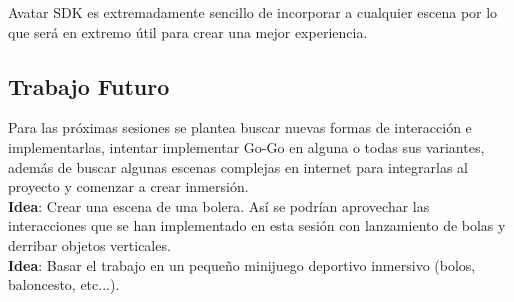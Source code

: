 \documentclass[12pt,a4paper]{article}
\begin{document}
Avatar SDK es extremadamente sencillo de incorporar a cualquier escena por lo que será en extremo útil para crear una mejor experiencia.

\subsection{Trabajo Futuro}

Para las próximas sesiones se plantea buscar nuevas formas de interacción e implementarlas, intentar implementar Go-Go en alguna o todas sus variantes, además de buscar algunas escenas complejas en internet para integrarlas al proyecto y comenzar a crear inmersión.\\
\textbf{Idea}: Crear una escena de una bolera. Así se podrían aprovechar las interacciones que se han implementado en esta sesión con lanzamiento de bolas y derribar objetos verticales.\\
\textbf{Idea}: Basar el trabajo en un pequeño minijuego deportivo inmersivo (bolos, baloncesto, etc...).
\end{document}
